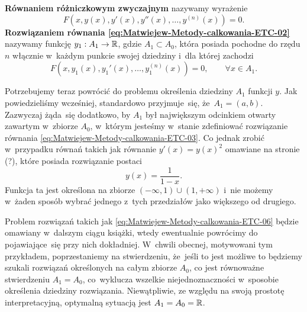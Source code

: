 \documentclass[a4paper,11pt]{article}
\begin{document}
\textbf{Równaniem
  różniczkowym zwyczajnym} nazywamy wyrażenie
\begin{equation}
  \label{eq:Matwiejew-Metody-calkowania-ETC-03}
  F\left( x, y( x ), y'( x ), y''( x ), \ldots, y^{ ( n ) }( x ) \right) = 0.
\end{equation}
\textbf{Rozwiązaniem równania \eqref{eq:Matwiejew-Metody-calkowania-ETC-02}}
nazywamy funkcję $y_{ 1 } : A_{ 1 } \to \mathbb{R}$, gdzie $A_{ 1 } \subset A_{ 0 }$, która
posiada pochodne do rzędu $n$ włącznie w~każdym punkcie swojej dziedziny
i~dla której zachodzi
\begin{equation}
  \label{eq:Matwiejew-Metody-calkowania-ETC-04}
  F\left( x, y_{ 1 }( x ), y_{ 1 }'( x ), \ldots, y_{ 1 }^{ ( n ) }( x ) \right) =
  0, \qquad
  \forall x \in A_{ 1 }.
\end{equation}

Potrzebujemy teraz powrócić do problemu określenia dziedziny $A_{ 1 }$
funkcji $y$. Jak powiedzieliśmy wcześniej, standardowo przyjmuje~się,
że~$A_{ 1 } = ( a, b )$. Zazwyczaj żąda~się dodatkowo, by $A_{ 1 }$ był
największym odcinkiem otwarty zawartym w~zbiorze $A_{ 0 }$, w~którym jesteśmy
w~stanie zdefiniować rozwiązanie równania
\eqref{eq:Matwiejew-Metody-calkowania-ETC-03}. Co jednak zrobić w~przypadku
równań takich jak równanie $y'( x ) = y( x )^{ 2 }$ omawiane na stronie (?),
które posiada rozwiązanie postaci
\begin{equation}
  \label{eq:Matwiejew-Metody-calkowania-ETC-05}
  y( x ) = \frac{ 1 }{ 1 - x }.
\end{equation}
Funkcja ta jest określona na zbiorze $( -\infty, 1 ) \cup ( 1, +\infty )$ i~nie możemy
w~żaden sposób wybrać jednego z~tych przedziałów jako większego od drugiego.

Problem rozwiązań takich jak \eqref{eq:Matwiejew-Metody-calkowania-ETC-06}
będzie omawiany w~dalszym ciągu książki, wtedy ewentualnie powrócimy do
pojawiające~się przy nich dokładniej. W~chwili obecnej, motywowani tym
przykładem, poprzestaniemy na stwierdzeniu, że~jeśli to jest możliwe to
będziemy szukali rozwiązań określonych na całym zbiorze $A_{ 0 }$, co jest
równoważne stwierdzeniu $A_{ 1 } = A_{ 0 }$, co~wyklucza wszelkie
niejednoznaczności w~sposobie określenia dziedziny rozwiązania.
Niewątpliwie, ze względu na swoją prostotę interpretacyjną, optymalną
sytuacją jest $A_{ 1 } = A_{ 0 } = \mathbb{R}$.

\vspace{\VerSpaceFour}
\end{document}

